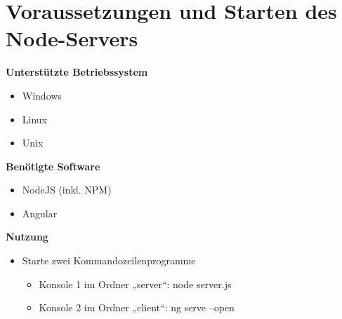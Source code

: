 \section{Voraussetzungen und Starten des Node-Servers}
\textbf{Unterstützte Betriebssystem}
\begin{itemize}
    \item Windows
    \item Linux
    \item Unix
\end{itemize} 
\textbf{Benötigte Software}
\begin{itemize}
    \item NodeJS (inkl. NPM)
    \item Angular
\end{itemize} 
\textbf{Nutzung}
\begin{itemize}
    \item Starte zwei Kommandozeilenprogramme
    \begin{itemize}
        \item Konsole 1 im Ordner „server“: node server.js 
        \item Konsole 2 im Ordner „client“: ng serve --open 
    \end{itemize}
\end{itemize} 
\newpage
